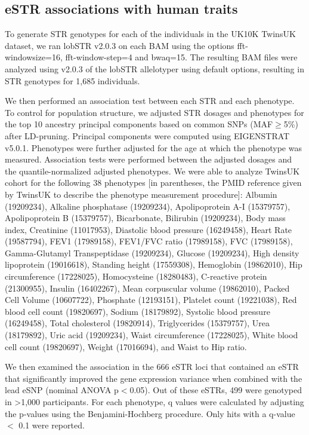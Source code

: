 \subsection{eSTR associations with human traits}
To generate STR genotypes for each of the individuals in the UK10K TwinsUK dataset, we ran lobSTR v2.0.3 on each BAM using the options fft-windowsize=16, fft-window-step=4 and bwaq=15. The resulting BAM files were analyzed using v2.0.3 of the lobSTR allelotyper using default options, resulting in STR genotypes for 1,685 individuals.

We then performed an association test between each STR and each phenotype. To control for population structure, we adjusted STR dosages and phenotypes for the top 10 ancestry principal components based on common SNPs (MAF$\geq$5\%) after LD-pruning. Principal components were computed using EIGENSTRAT \cite{PattersonPriceReich2006} v5.0.1. Phenotypes were further adjusted for the age at which the phenotype was measured. Association tests were performed between the adjusted dosages and the quantile-normalized adjusted phenotypes. 
 We were able to analyze TwinsUK cohort for the following 38 phenotypes [in parentheses, the PMID reference given by TwinsUK to describe the phenotype measurement procedure]: Albumin (19209234), Alkaline phosphatase (19209234), Apolipoprotein A-I (15379757), Apolipoprotein B (15379757), Bicarbonate, Bilirubin (19209234), Body mass index, Creatinine (11017953), Diastolic blood pressure (16249458), Heart Rate (19587794), FEV1 (17989158), FEV1/FVC ratio (17989158), FVC (17989158), Gamma-Glutamyl Transpeptidase (19209234), Glucose (19209234), High density lipoprotein (19016618), Standing height (17559308), Hemoglobin (19862010), Hip circumference (17228025), Homocysteine (18280483), C-reactive protein (21300955), Insulin (16402267), Mean corpuscular volume (19862010), Packed Cell Volume (10607722), Phosphate (12193151), Platelet count (19221038), Red blood cell count (19820697), Sodium (18179892), Systolic blood pressure (16249458), Total cholesterol (19820914), Triglycerides (15379757), Urea (18179892), Uric acid (19209234), Waist circumference (17228025), White blood cell count (19820697), Weight (17016694), and Waist to Hip ratio.

We then examined the association in the 666 eSTR loci that contained an eSTR that significantly improved the gene expression variance when combined with the lead eSNP (nominal ANOVA p$<$0.05). Out of these eSTRs, 499 were genotyped in >1,000 participants. For each phenotype, q values were calculated by adjusting the p-values using the Benjamini-Hochberg procedure. Only hits with a q-value $<$ 0.1 were reported.

